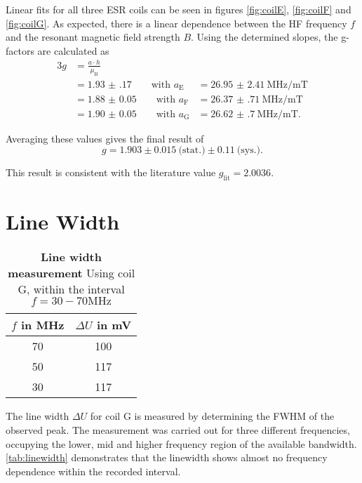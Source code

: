 Linear fits for all three ESR coils can be seen in figures \ref{fig:coilE}, \ref{fig:coilF} and \ref{fig:coilG}.
As expected, there is a linear dependence between the HF frequency $f$ and the resonant magnetic field strength $B$.
Using the determined slopes, the g-factors are calculated as
\begin{alignat*}{3}
	g &= \frac{a\cdot h}{\mu_\text{B}} \\
	&= \num{1.93(17)}\qquad\text{with } a_\text{E}&=\SI{26.95(241)}{\MHz\per\milli\tesla} \\
	&= \num{1.88(5)}\qquad\text{with } a_\text{F}&=\SI{26.37(71)}{\MHz\per\milli\tesla} \\
	&= \num{1.90(5)}\qquad\text{with } a_\text{G}&=\SI{26.62(70)}{\MHz\per\milli\tesla}.
\end{alignat*}

Averaging these values gives the final result of
\begin{equation*}
	g = \num{1.903}\pm\num{0.015}\ \text{(stat.)}\pm\num{0.11}\ \text{(sys.)}.
\end{equation*}

This result is consistent with the literature value $g_\text{lit}%
=\num{2.0036}$\cite{g-factor}.

\section{Line Width}
\begin{table}[tbp]
	\centering
	\caption[Line width]{\textbf{Line width measurement} Using coil G, within the interval $f=30-70\si{\MHz}$}
	\label{tab:linewidth}
	\begin{tabular}{SS}
		\toprule
		{$f$ in \si{\MHz}}	&	{$\Delta U$ in \si{\mV}}	\\
			&	100	\\
		50	&	117	\\
		30	&	117	\\
		\bottomrule
	\end{tabular}
\end{table}
The line width $\Delta U$ for coil G is measured by determining the FWHM of the observed peak.
The measurement was carried out for three different frequencies, occupying the lower, mid and higher frequency region of the available bandwidth.
\autoref{tab:linewidth} demonstrates that the linewidth shows almost no frequency dependence within the recorded interval.
